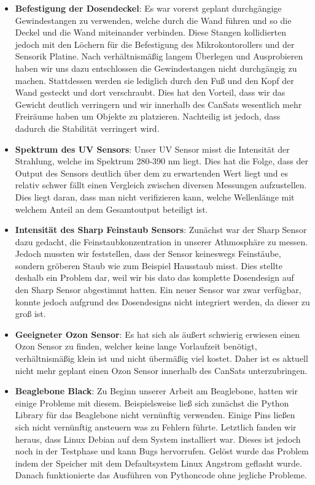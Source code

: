 \begin{itemize}
	\item \textbf{Befestigung der Dosendeckel}: Es war vorerst geplant durchgängige Gewindestangen zu verwenden, welche durch die Wand führen und so die Deckel und die Wand miteinander verbinden. Diese Stangen kollidierten jedoch mit den Löchern für die Befestigung des Mikrokontorollers und der Sensorik Platine. Nach verhältnismäßig langem Überlegen und Ausprobieren haben wir uns dazu entschlossen die Gewindestangen nicht durchgängig zu machen. Stattdessen werden sie lediglich durch den Fuß und den Kopf der Wand gesteckt und dort verschraubt. Dies hat den Vorteil, dass wir das Gewicht deutlich verringern und wir innerhalb des CanSats wesentlich mehr Freiräume haben um Objekte zu platzieren. Nachteilig ist jedoch, dass dadurch die Stabilität verringert wird.
	\item \textbf{Spektrum des UV Sensors}: Unser UV Sensor misst die Intensität der Strahlung, welche im Spektrum 280-390 nm liegt. Dies hat die Folge, dass der Output des Sensors deutlich über dem zu erwartenden Wert liegt und es relativ schwer fällt einen Vergleich zwischen diversen Messungen aufzustellen. Dies liegt daran, dass man nicht verifizieren kann, welche Wellenlänge mit welchem Anteil an dem Gesamtoutput beteiligt ist.
	\item \textbf{Intensität des Sharp Feinstaub Sensors}: Zunächst war der Sharp Sensor dazu gedacht, die Feinstaubkonzentration in unserer Athmosphäre zu messen. Jedoch mussten wir feststellen, dass der Sensor keineswegs Feinstäube, sondern gröberen Staub wie zum Beispiel Hausstaub misst. Dies stellte deshalb ein Problem dar, weil wir bis dato das komplette Dosendesign auf den Sharp Sensor abgestimmt hatten. Ein neuer Sensor war zwar verfügbar, konnte jedoch aufgrund des Dosendesigns nicht integriert werden, da dieser zu groß ist.
	\item \textbf{Geeigneter Ozon Sensor}: Es hat sich als äußert schwierig erwiesen einen Ozon Sensor zu finden, welcher keine lange Vorlaufzeit benötigt, verhältnismäßig klein ist und nicht übermäßig viel kostet. Daher ist es aktuell nicht mehr geplant einen Ozon Sensor innerhalb des CanSats unterzubringen.
	\item \textbf{Beaglebone Black}: Zu Beginn unserer Arbeit am Beaglebone, hatten wir einige Probleme mit diesem. Beispielsweise ließ sich zunächst die Python Library für das Beaglebone nicht vernünftig verwenden. Einige Pins ließen sich nicht vernünftig ansteuern was zu Fehlern führte. Letztlich fanden wir heraus, dass Linux Debian auf dem System installiert war. Dieses ist jedoch noch in der Testphase und kann Bugs hervorrufen. Gelöst wurde das Problem indem der Speicher mit dem Defaultsystem Linux Angstrom geflasht wurde. Danach funktionierte das Ausführen von Pythoncode ohne jegliche Probleme.

\end{itemize}

